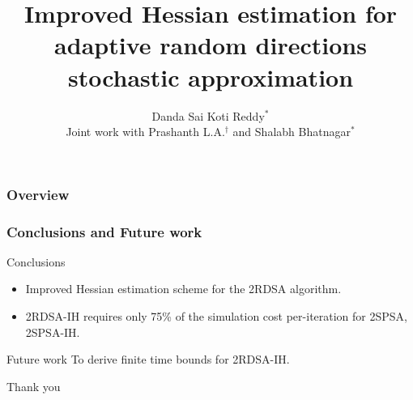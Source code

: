 \documentclass{beamer}
\title[Stochastic optimization]{Improved Hessian estimation for adaptive random directions stochastic approximation} %
\author{ Danda Sai Koti Reddy$^*$\\[1.5ex]
{\footnotesize Joint work with Prashanth L.A.$^\dagger$ and Shalabh Bhatnagar$^*$}
} %
\institute %
{
$*$ Indian Institute of Science, Bangalore\\
$\dagger$ University of Maryland, College Park
}
\date{} %
\begin{document}
\begin{frame}
\titlepage 
\end{frame}

\begin{frame}
\frametitle{Overview}
\tableofcontents
\end{frame}



%



\begin{frame}
\frametitle{\centering  Conclusions and Future work}
\begin{block}{\alert{Conclusions}}
\begin{itemize}
\item Improved Hessian estimation scheme for the 2RDSA algorithm.
\item  2RDSA-IH requires only 75\% of the simulation cost per-iteration for 2SPSA, 2SPSA-IH.
\end{itemize}
\end{block}
\begin{block}{\alert{Future work}}
To derive finite time bounds for 2RDSA-IH.
\end{block}

\end{frame}



%
%


\begin{frame}

\begin{block}{}
\begin{center}
{\Huge Thank you}
\end{center}
\end{block}
\end{frame}
\end{document}
